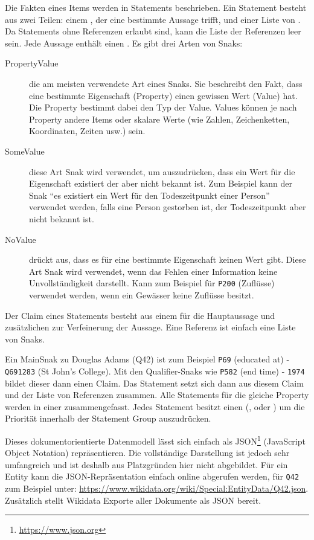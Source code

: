 Die Fakten eines Items werden in Statements beschrieben.
Ein Statement besteht aus zwei Teilen: einem , der eine bestimmte Aussage trifft, und einer Liste von .
Da Statements ohne Referenzen erlaubt sind, kann die Liste der Referenzen leer sein.
Jede Aussage enthält einen .
Es gibt drei Arten von Snaks:
\begin{description}
\item[PropertyValue] die am meisten verwendete Art eines Snaks. Sie beschreibt den Fakt, dass eine bestimmte Eigenschaft (Property) einen gewissen Wert (Value) hat. Die Property bestimmt dabei den Typ der Value. Values können je nach Property andere Items oder skalare Werte (wie Zahlen, Zeichenketten, Koordinaten, Zeiten usw.) sein.
\item[SomeValue] diese Art Snak wird verwendet, um auszudrücken, dass ein Wert für die Eigenschaft existiert der aber nicht bekannt ist. Zum Beispiel kann der Snak "`es existiert ein Wert für den Todeszeitpunkt einer Person"' verwendet werden, falls eine Person gestorben ist, der Todeszeitpunkt aber nicht bekannt ist.
\item[NoValue] drückt aus, dass es für eine bestimmte Eigenschaft keinen Wert gibt. Diese Art Snak wird verwendet, wenn das Fehlen einer Information keine Unvollständigkeit darstellt. Kann zum Beispiel für \verb|P200| (Zuflüsse) verwendet werden, wenn ein Gewässer keine Zuflüsse besitzt. 
\end{description}
Der Claim eines Statements besteht aus einem  für die Hauptaussage und zusätzlichen  zur Verfeinerung der Aussage.
Eine Referenz ist einfach eine Liste von Snaks. 

Ein MainSnak zu Douglas Adams (Q42) ist zum Beispiel \verb|P69| (educated at) - \verb|Q691283| (St John's College).
Mit den Qualifier-Snaks wie \verb|P582| (end time) - \verb|1974| bildet dieser dann einen Claim.
Das Statement setzt sich dann aus diesem Claim und der Liste von Referenzen zusammen.
Alle Statements für die gleiche Property werden in einer  zusammengefasst.
Jedes Statement besitzt einen  (,  oder ) um die Priorität innerhalb der Statement Group auszudrücken.

Dieses dokumentorientierte Datenmodell lässt sich einfach als JSON\footnote{\url{https://www.json.org}} (JavaScript Object Notation) repräsentieren.
Die vollständige Darstellung ist jedoch sehr umfangreich und ist deshalb aus Platzgründen hier nicht abgebildet.
Für ein Entity kann die JSON-Repräsentation einfach online abgerufen werden, für \verb|Q42| zum Beispiel unter: \url{https://www.wikidata.org/wiki/Special:EntityData/Q42.json}.
Zusätzlich stellt Wikidata Exporte aller Dokumente als JSON bereit.

